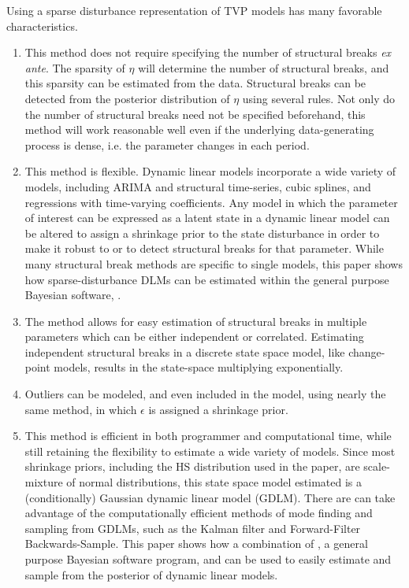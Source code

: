\documentclass{article}
\begin{document}
Using a sparse disturbance representation of TVP models has many favorable characteristics.
\begin{enumerate}
\item This method does not require specifying the number of structural breaks \textit{ex ante}.
The sparsity of $\eta$ will determine the number of structural breaks, and this sparsity can be estimated from the data.
Structural breaks can be detected from the posterior distribution of $\eta$ using several rules.
Not only do the number of structural breaks need not be specified beforehand, this method will work reasonable well even if the underlying data-generating process is dense, i.e. the parameter changes in each period.
\item This method is flexible.
Dynamic linear models incorporate a wide variety of models, including ARIMA and structural time-series, cubic splines, and regressions with time-varying coefficients.
Any model in which the parameter of interest can be expressed as a latent state in a dynamic linear model can be altered to assign a shrinkage prior to the state disturbance in order to make it robust to or to detect structural breaks for that parameter.
While many structural break methods are specific to single models, this paper shows how sparse-disturbance DLMs can be estimated within the general purpose Bayesian software, \Stan{}.
\item The method allows for easy estimation of structural breaks in multiple parameters which can be either independent or correlated.
Estimating independent structural breaks in a discrete state space model, like change-point models, results in the state-space multiplying exponentially.
\item Outliers can be modeled, and even included in the model, using nearly the same method, in which $\epsilon$ is assigned a shrinkage prior.
\item This method is efficient in both programmer and computational time, while still retaining the flexibility to estimate a wide variety of models.
Since most shrinkage priors, including the HS distribution used in the paper, are scale-mixture of normal distributions, this state space model estimated is a (conditionally) Gaussian dynamic linear model (GDLM). There are can take advantage of the computationally efficient methods of mode finding and sampling from GDLMs, such as the Kalman filter and Forward-Filter Backwards-Sample.
This paper shows how a combination of \Stan{}, a general purpose Bayesian software program, and \RLang{} can be used to easily estimate and sample from the posterior of dynamic linear models.
\end{enumerate}
\end{document}
